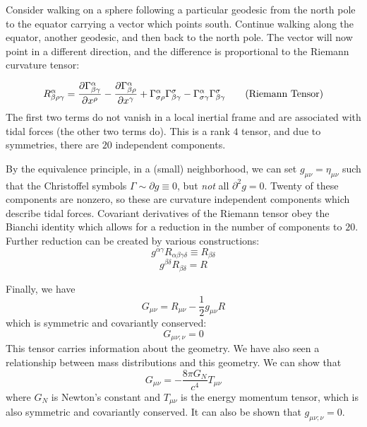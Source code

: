 \documentclass[a4paper,twoside,master.tex]{subfiles}
\begin{document}

Consider walking on a sphere following a particular geodesic from the north pole to the equator carrying a vector which points south. Continue walking along the equator, another geodesic, and then back to the north pole. The vector will now point in a different direction, and the difference is proportional to the Riemann curvature tensor:

\begin{equation}
    R^{\alpha}_{\beta \rho \gamma} = \pdv{\Gamma^{\alpha}_{\beta \gamma}}{x^{\rho}} - \pdv{\Gamma^{\alpha}_{\beta \rho}}{x^{\gamma}} + \Gamma^{\alpha}_{\sigma \rho} \Gamma^{\sigma}_{\beta \gamma} - \Gamma^{\alpha}_{\sigma \gamma} \Gamma^{\sigma}_{\beta \gamma} \tag{Riemann Tensor}
\end{equation}
The first two terms do not vanish in a local inertial frame and are associated with tidal forces (the other two terms do). This is a rank $ 4 $ tensor, and due to symmetries, there are $ 20 $ independent components.


By the equivalence principle, in a (small) neighborhood, we can set $ g_{\mu \nu} = \eta_{\mu \nu} $ such that the Christoffel symbols $ \Gamma \sim \partial g \equiv 0 $, but \textit{not} all $ \partial^2 g = 0 $. Twenty of these components are nonzero, so these are curvature independent components which describe tidal forces. Covariant derivatives of the Riemann tensor obey the Bianchi identity which allows for a reduction in the number of components to $ 20 $. Further reduction can be created by various constructions:
\begin{equation}
    g^{\alpha \gamma} R_{\alpha \beta \gamma \delta} \equiv R_{\beta \delta} \tag{Ricci Tensor}
\end{equation}
\begin{equation}
    g^{\beta \delta} R_{\beta \delta} = R \tag{Ricci Scalar}
\end{equation}

Finally, we have
\begin{equation}
    G_{\mu \nu} = R_{\mu \nu} - \frac{1}{2} g_{\mu \nu} R \tag{Einstein Tensor}
\end{equation}
which is symmetric and covariantly conserved:
\begin{equation}
    G_{\mu \nu ; \nu} = 0
\end{equation}
This tensor carries information about the geometry. We have also seen a relationship between mass distributions and this geometry. We can show that
\begin{equation}
    G_{\mu \nu} = - \frac{8 \pi G_N}{c^4} T_{\mu \nu}
\end{equation}
where $ G_{N} $ is Newton's constant and $ T_{\mu \nu} $ is the energy momentum tensor, which is also symmetric and covariantly conserved. It can also be shown that $ g_{\mu \nu ; \nu} = 0 $.
\end{document}
